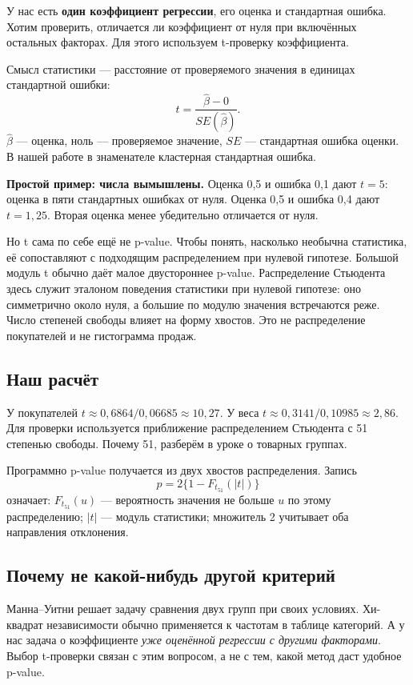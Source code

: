 \documentclass[12pt,a4paper]{article}
\newcommand{\toy}[1]{\par\textbf{Простой пример: числа вымышлены.} #1\par}
\begin{document}
У нас есть \textbf{один коэффициент регрессии}, его оценка и стандартная ошибка. Хотим проверить, отличается ли коэффициент от нуля при включённых остальных факторах. Для этого используем t-проверку коэффициента.

Смысл статистики --- расстояние от проверяемого значения в единицах стандартной ошибки:
\[
 t=\frac{\widehat\beta-0}{SE(\widehat\beta)}.
\]
$\widehat\beta$ --- оценка, ноль --- проверяемое значение, $SE$ --- стандартная ошибка оценки. В нашей работе в знаменателе кластерная стандартная ошибка.

\toy{Оценка 0,5 и ошибка 0,1 дают $t=5$: оценка в пяти стандартных ошибках от нуля. Оценка 0,5 и ошибка 0,4 дают $t=1{,}25$. Вторая оценка менее убедительно отличается от нуля.}

Но t сама по себе ещё не p-value. Чтобы понять, насколько необычна статистика, её сопоставляют с подходящим распределением при нулевой гипотезе. Большой модуль t обычно даёт малое двустороннее p-value. Распределение Стьюдента здесь служит эталоном поведения статистики при нулевой гипотезе: оно симметрично около нуля, а большие по модулю значения встречаются реже. Число степеней свободы влияет на форму хвостов. Это не распределение покупателей и не гистограмма продаж.

\subsection{Наш расчёт}

У покупателей $t\approx0{,}6864/0{,}06685\approx10{,}27$. У веса $t\approx0{,}3141/0{,}10985\approx2{,}86$. Для проверки используется приближение распределением Стьюдента с 51 степенью свободы. Почему 51, разберём в уроке о товарных группах.

Программно p-value получается из двух хвостов распределения. Запись
\[
 p=2\{1-F_{t_{51}}(|t|)\}
\]
означает: $F_{t_{51}}(u)$ --- вероятность значения не больше $u$ по этому распределению; $|t|$ --- модуль статистики; множитель 2 учитывает оба направления отклонения.

\subsection{Почему не какой-нибудь другой критерий}

Манна--Уитни решает задачу сравнения двух групп при своих условиях. Хи-квадрат независимости обычно применяется к частотам в таблице категорий. А у нас задача о коэффициенте \emph{уже оценённой регрессии с другими факторами}. Выбор t-проверки связан с этим вопросом, а не с тем, какой метод даст удобное p-value.
\end{document}
